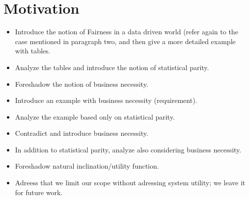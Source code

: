 \section{Motivation}
\begin{itemize}
  \item Introduce the notion of Fairness in a data driven world (refer again to the case mentioned
    in paragraph two, and then give a more detailed example with tables.
  \item Analyze the tables and introduce the notion of statistical parity.
  \item Foreshadow the notion of business necessity.
  \item Introduce an example with business necessity (requirement).
  \item Analyze the example based only on statistical parity.
  \item Contradict and introduce business necessity.
  \item In addition to statistical parity, analyze also considering
    business necessity.
  \item Foreshadow natural inclination/utility function.
  \item Adreess that we limit our scope without adressing system utility; we leave it for future work.
\end{itemize}
